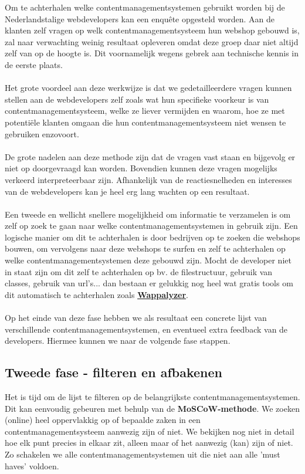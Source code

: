 Om te achterhalen welke contentmanagementsystemen gebruikt worden bij de Nederlandstalige webdevelopers kan een enquête opgesteld worden. Aan de klanten zelf vragen op welk contentmanagementsysteem hun webshop gebouwd is, zal naar verwachting weinig resultaat opleveren omdat deze groep daar niet altijd zelf van op de hoogte is. Dit voornamelijk wegens gebrek aan technische kennis in de eerste plaats.
\\\\
Het grote voordeel aan deze werkwijze is dat we gedetailleerdere vragen kunnen stellen aan de webdevelopers zelf zoals wat hun specifieke voorkeur is van contentmanagementsysteem, welke ze liever vermijden en waarom, hoe ze met potentiële klanten omgaan die hun contentmanagementsysteem niet wensen te gebruiken enzovoort.
\\\\
De grote nadelen aan deze methode zijn dat de vragen vast staan en bijgevolg er niet op doorgevraagd kan worden. Bovendien kunnen deze vragen mogelijks verkeerd interpreteerbaar zijn. Afhankelijk van de reactiesnelheden en interesses van de webdevelopers kan je heel erg lang wachten op een resultaat.
\\\\
Een tweede en wellicht snellere mogelijkheid om informatie te verzamelen is om zelf op zoek te gaan naar welke contentmanagementsystemen in gebruik zijn. Een logische manier om dit te achterhalen is door bedrijven op te zoeken die webshops bouwen, om vervolgens naar deze webshops te surfen en zelf te achterhalen op welke contentmanagementsystemen deze gebouwd zijn. Mocht de developer niet in staat zijn om dit zelf te achterhalen op bv. de filestructuur, gebruik van classes, gebruik van url's... dan bestaan er gelukkig nog heel wat gratis tools om dit automatisch te achterhalen zoals \textbf{\href{https://chrome.google.com/webstore/detail/wappalyzer-technology-pro/gppongmhjkpfnbhagpmjfkannfbllamg}{Wappalyzer}}.
\\\\
Op het einde van deze fase hebben we als resultaat een concrete lijst van verschillende contentmanagementsystemen, en eventueel extra feedback van de developers. Hiermee kunnen we naar de volgende fase stappen.

\subsection{Tweede fase - filteren en afbakenen}

Het is tijd om de lijst te filteren op de belangrijkste contentmanagementsystemen. Dit kan eenvoudig gebeuren met behulp van de \textbf{MoSCoW-methode}. We zoeken (online) heel oppervlakkig op of bepaalde zaken in een contentmanagementsysteem aanwezig zijn of niet. We bekijken nog niet in detail hoe elk punt precies in elkaar zit, alleen maar of het aanwezig (kan) zijn of niet. Zo schakelen we alle contentmanagementsystemen uit die niet aan alle 'must haves' voldoen.\\

